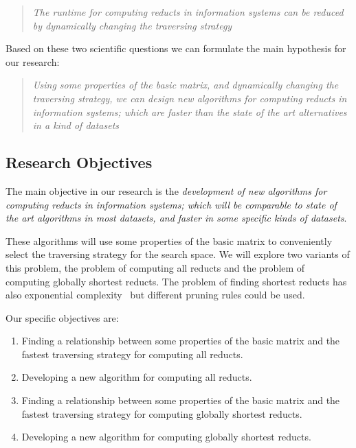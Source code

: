 \documentclass[authoryear,11pt]{elsarticle}
\begin{document}
\begin{quote}
  \emph{The runtime for computing reducts in information systems can be reduced by 
  		dynamically changing the traversing strategy}
\end{quote}

  Based on these two scientific questions we can formulate the main hypothesis for our research:
  
\begin{quote}
  \emph{Using some properties of the basic matrix, and dynamically changing the traversing 
  		strategy, we can design new algorithms for computing reducts in information systems; which are
  		faster than the state of the art alternatives in a kind of datasets}
\end{quote}  

\subsection{Research Objectives}\label{Goals} 
  The main objective in our research is the \emph{development of new algorithms for computing reducts in
  information systems; which will be comparable to state of the art algorithms 
  in most datasets, and faster in some specific kinds of datasets}. 
  
  These algorithms will use some properties 
  of the basic matrix to conveniently select the traversing strategy for the search space. We will explore two
  variants of this problem, the problem of computing all reducts and the problem of computing globally 
  shortest reducts. The problem of finding shortest reducts has also 
  exponential complexity~\citep{Lin04} but different pruning rules could be used.
  
  Our specific objectives are:
  \begin{enumerate}
  \item Finding a relationship between some properties of the basic matrix and the fastest 
  		traversing strategy for computing all reducts.
  
  \item Developing a new algorithm for computing all reducts.
  		
  \item Finding a relationship between some properties of the basic matrix and the fastest 
  		traversing strategy for computing globally shortest reducts.
  
  \item Developing a new algorithm for computing globally shortest reducts.

  \end{enumerate}
\end{document}
